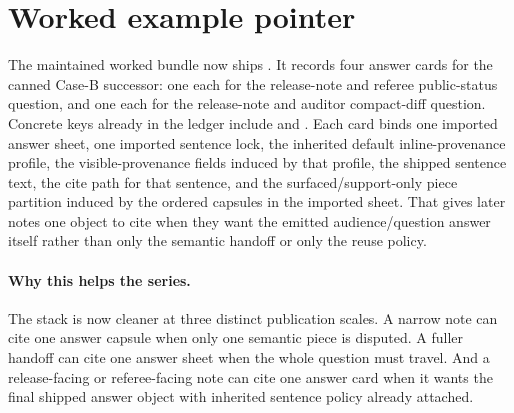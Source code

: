 \documentclass[11pt]{article}
\begin{document}
\section{Worked example pointer}
The maintained worked bundle now ships .\cite{series:workedexample}
It records four answer cards for the canned Case-B successor: one each for the release-note and referee public-status question, and one each for the release-note and auditor compact-diff question.
Concrete keys already in the ledger include  and .
Each card binds one imported answer sheet, one imported sentence lock, the inherited default inline-provenance profile, the visible-provenance fields induced by that profile, the shipped sentence text, the cite path for that sentence, and the surfaced/support-only piece partition induced by the ordered capsules in the imported sheet.
That gives later notes one object to cite when they want the emitted audience/question answer itself rather than only the semantic handoff or only the reuse policy.

\paragraph{Why this helps the series.}
The stack is now cleaner at three distinct publication scales.
A narrow note can cite one answer capsule when only one semantic piece is disputed.
A fuller handoff can cite one answer sheet when the whole question must travel.
And a release-facing or referee-facing note can cite one answer card when it wants the final shipped answer object with inherited sentence policy already attached.
\end{document}
